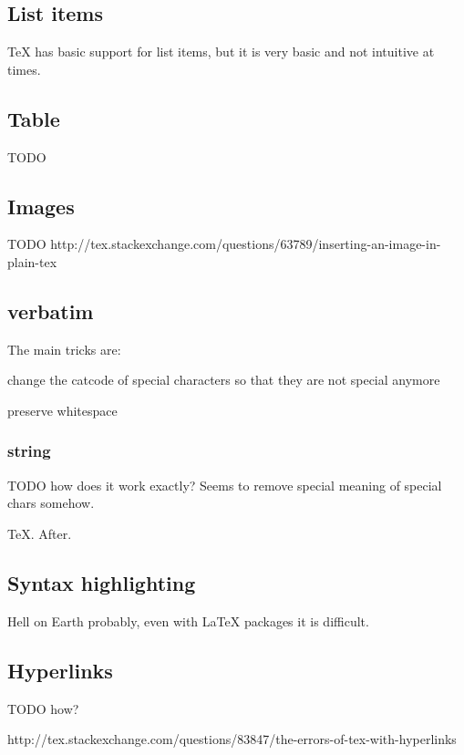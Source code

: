   \subsection{List items}

    TeX has basic support for list items, but it is very basic and not intuitive at times.

  \subsection{Table}

    TODO

  \subsection{Images}

    TODO http://tex.stackexchange.com/questions/63789/inserting-an-image-in-plain-tex

  \subsection{verbatim}

    The main tricks are:

    \item{} change the catcode of special characters so that they are not special anymore
    \item{} preserve whitespace

    \subsubsection{string}

      TODO how does it work exactly? Seems to remove special meaning of special chars somehow.

      {\string \TeX. After.}

  \subsection{Syntax highlighting}

    Hell on Earth probably, even with LaTeX packages it is difficult.

  \subsection{Hyperlinks}

    TODO how?

    http://tex.stackexchange.com/questions/83847/the-errors-of-tex-with-hyperlinks

